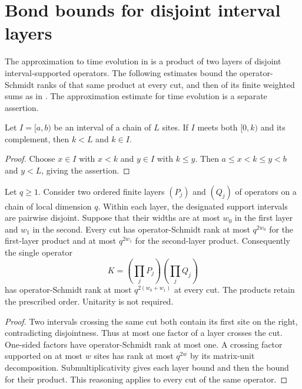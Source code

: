 \section{Bond bounds for disjoint interval layers}
\label{sec:huang_block_product_bonds}

The approximation to time evolution in
\cite[Figure 2]{Osborne2006Dynamics} is a product of two layers of disjoint
interval-supported operators. The following estimates bound the operator-Schmidt
ranks of that same product at every cut, and then of its finite weighted sums as in
\cite[Section 5.4, equation (22)]{Huang2015GroundState}. The approximation estimate
for time evolution is a separate assertion.

\begin{lemma}
    \label{thm:huang_crossing_interval_boundary}
    \leanok
    Let $I=[a,b)$ be an interval of a chain of $L$ sites. If $I$ meets both
    $[0,k)$ and its complement, then $k<L$ and $k\in I$.
\end{lemma}
\begin{proof}
    \leanok
    Choose $x\in I$ with $x<k$ and $y\in I$ with $k\le y$. Then
    $a\le x<k\le y<b$ and $y<L$, giving the assertion.
\end{proof}

\begin{lemma}
    \label{thm:huang_two_interval_layer_ranks}
    \leanok
    Let $q\ge1$. Consider two ordered finite layers $(P_j)$ and $(Q_j)$ of
    operators on a chain of local dimension $q$. Within each layer, the designated
    support intervals are pairwise disjoint. Suppose that their widths are at most
    $w_0$ in the first layer and $w_1$ in the second.
    Every cut has operator-Schmidt rank at most $q^{2w_0}$ for the first-layer
    product and at most $q^{2w_1}$ for the second-layer product. Consequently the
    single operator
    \[
        K=\left(\prod_jP_j\right)\left(\prod_jQ_j\right)
    \]
    has operator-Schmidt rank at most $q^{2(w_0+w_1)}$ at every cut.
    The products retain the prescribed order. Unitarity is not required.
\end{lemma}
\begin{proof}
    \leanok
    Two intervals crossing the same cut both contain its first site on the right,
    contradicting disjointness. Thus at most one factor of a layer crosses the cut.
    One-sided factors have operator-Schmidt rank at most one. A crossing factor
    supported on at most $w$ sites has rank at most $q^{2w}$ by its matrix-unit
    decomposition. Submultiplicativity gives each layer bound and then the bound
    for their product. This reasoning applies to every cut of the same operator.
\end{proof}

